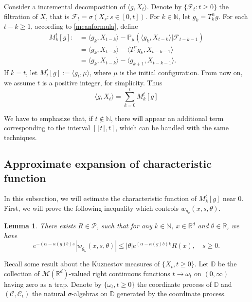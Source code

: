 \documentclass[12pt, a4paper]{amsart}
\newtheorem{lem}[thm]{Lemma}
\theoremstyle{definition}
\numberwithin{equation}{section}
\begin{document}
Consider a incremental decomposition of $\langle g,X_t \rangle$. Denote by $\{\mathcal{F}_t:t\geq 0\}$ the filtration of $X$, that is $\mathcal{F}_t=\sigma(X_s:s\in [0,t])$. For $k \in \mathbb{N}$, let $g_k=T^{\alpha}_k g$. For each $t-k\geq 1$, according to \eqref{meanformula}, define
\begin{align*}
    M_k^t[g]:&=\langle g_k, X_{t-k}\rangle-\mathbb{P}_{\mu}(\langle g_k,X_{t-k}\rangle|\mathcal{F}_{t-k-1})\\
    &=\langle g_k, X_{t-k}\rangle-\langle T_1^{\alpha}g_{k},X_{t-k-1}\rangle\\
    &=\langle g_k, X_{t-k}\rangle-\langle g_{k+1},X_{t-k-1}\rangle.
\end{align*}
If $k=t$, let $M_t^t[g]:=\langle g_t,\mu\rangle$, where $\mu $ is the initial configuration. From now on, we assume $t$ is a positive integer, for simplicity. Thus
\begin{equation}\label{decomposition}
    \langle g,X_t\rangle=\sum_{k=0}^{t}M_k^t[g]
\end{equation}

{\color{red} We have to emphasize that, if $t\notin \mathbb{N}$, there will appear an additional term corresponding to the interval $[\lfloor t \rfloor,t]$, which can be handled with the same techniques.}
\subsection{Approximate expansion of characteristic function}

In this subsection, we will estimate the characteristic function of $M_k^t[g]$ near $0$. First, we will prove the following inequality which controls $w_{g_k}(x,s,\theta)$.
\begin{lem}\label{lemma1}
There exists $R \in \mathcal{P}$, such that for any $k \in \mathbb{N}$, $x\in\mathbb{R}^d$ and $\theta\in \mathbb{R}$, we have
$$e^{-(\alpha-\kappa(g)b) s}|w_{g_k}(x,s,\theta)|\leq |\theta|e^{(\alpha-\kappa(g)b)k} R(x), \quad s\geq 0.$$
\end{lem}
Recall some result about the Kuznestov measures of $\{X_t, t\geq 0\}$. Let $\mathbb{D}$ be the collection of $\mathcal{M}(\mathbb{R}^d)$-valued right continuous functions $t\rightarrow \omega_t$ on $(0,\infty)$ having zero as a trap. Denote by $\{\omega_t, t\geq0\}$ the coordinate process of $\mathbb{D}$ and
 $(\mathcal{C},\mathcal{C}_t)$ the natural $\sigma$-algebras on $\mathbb{D}$ generated by the coordinate process.
\end{document}
